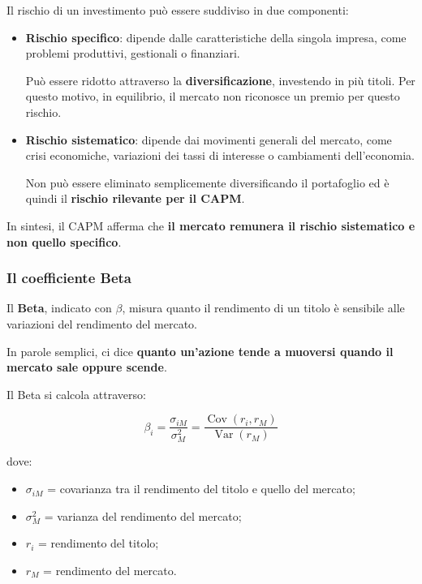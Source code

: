 \noindent Il rischio di un investimento può essere
suddiviso in due componenti:

\begin{itemize}
    \item \textbf{Rischio specifico}: dipende dalle
    caratteristiche della singola impresa,
    come problemi produttivi, gestionali o finanziari.

    \noindent Può essere ridotto attraverso la
    \textbf{diversificazione}, investendo in più titoli.
    Per questo motivo, in equilibrio, il mercato
    non riconosce un premio per questo rischio.

    \item \textbf{Rischio sistematico}: dipende
    dai movimenti generali del mercato, come crisi
    economiche, variazioni dei tassi di interesse
    o cambiamenti dell'economia.

    \noindent Non può essere eliminato semplicemente
    diversificando il portafoglio ed è quindi
    il \textbf{rischio rilevante per il CAPM}.
\end{itemize}

\noindent In sintesi, il CAPM afferma che
\textbf{il mercato remunera il rischio sistematico
e non quello specifico}.


\subsubsection*{Il coefficiente Beta}

\noindent Il \textbf{Beta}, indicato con $\beta$,
misura quanto il rendimento di un titolo
è sensibile alle variazioni del rendimento del mercato.

\medskip

\noindent In parole semplici, ci dice
\textbf{quanto un'azione tende a muoversi
quando il mercato sale oppure scende}.

\medskip

\noindent Il Beta si calcola attraverso:

\[
\boxed{
\beta_i=
\frac{\sigma_{iM}}{\sigma_M^2}
=
\frac{\operatorname{Cov}(r_i,r_M)}
{\operatorname{Var}(r_M)}
}
\]

\noindent dove:

\begin{itemize}
    \item $\sigma_{iM}$ = covarianza tra il
    rendimento del titolo e quello del mercato;

    \item $\sigma_M^2$ = varianza del rendimento
    del mercato;

    \item $r_i$ = rendimento del titolo;

    \item $r_M$ = rendimento del mercato.
\end{itemize}

